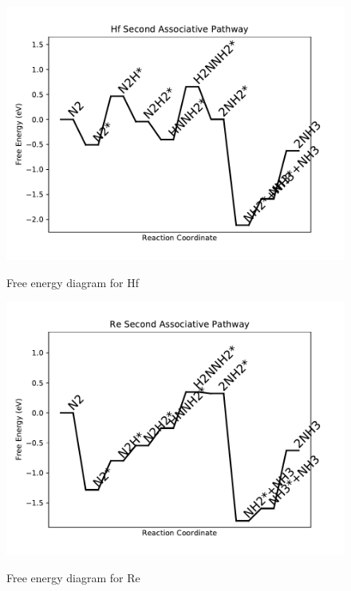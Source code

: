 \documentclass[journal=jacsat,manuscript=article]{achemso}
\begin{document}
\begin{figure}
\includegraphics[width=1\linewidth]{data/plots/Hf_associative_2.pdf}
\label{fig:Hf_associative_2}
\caption{Free energy diagram for Hf}
\end{figure}

\newpage
\begin{figure}
\includegraphics[width=1\linewidth]{data/plots/Re_associative_2.pdf}
\label{fig:Re_associative_2}
\caption{Free energy diagram for Re}
\end{figure}
\end{document}
